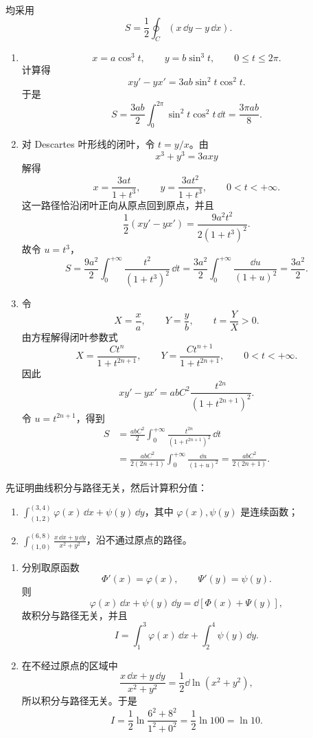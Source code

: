 \begin{xsolution}
均采用
\[
  S=\frac12\oint_C(x\,\dd y-y\,\dd x).
\]
\begin{enumerate}[label=(\arabic*)]
\item
\[
  x=a\cos^3t,\qquad y=b\sin^3t,\qquad0\le t\le2\pi.
\]
计算得
\[
  x y'-y x'=3ab\sin^2t\cos^2t.
\]
于是
\[
  S=\frac{3ab}{2}\int_0^{2\pi}\sin^2t\cos^2t\,\dd t
   =\frac{3\pi ab}{8}.
\]

\item 对 Descartes 叶形线的闭叶，令 $t=y/x$。由
\[
  x^3+y^3=3axy
\]
解得
\[
  x=\frac{3at}{1+t^3},
  \qquad
  y=\frac{3at^2}{1+t^3},
  \qquad0<t<+\infty.
\]
这一路径恰沿闭叶正向从原点回到原点，并且
\[
  \frac12(xy'-yx')=\frac{9a^2t^2}{2(1+t^3)^2}.
\]
故令 $u=t^3$，
\[
  S=\frac{9a^2}{2}\int_0^{+\infty}\frac{t^2}{(1+t^3)^2}\,\dd t
   =\frac{3a^2}{2}\int_0^{+\infty}\frac{\dd u}{(1+u)^2}
   =\frac{3a^2}{2}.
\]

\item 令
\[
  X=\frac xa,\qquad Y=\frac yb,
  \qquad t=\frac YX>0.
\]
由方程解得闭叶参数式
\[
  X=\frac{Ct^n}{1+t^{2n+1}},
  \qquad
  Y=\frac{Ct^{n+1}}{1+t^{2n+1}},
  \qquad0<t<+\infty.
\]
因此
\[
  xy'-yx'
  =abC^2\frac{t^{2n}}{(1+t^{2n+1})^2}.
\]
令 $u=t^{2n+1}$，得到
\begin{align*}
  S
  &=\frac{abC^2}{2}\int_0^{+\infty}
    \frac{t^{2n}}{(1+t^{2n+1})^2}\,\dd t\\
  &=\frac{abC^2}{2(2n+1)}
    \int_0^{+\infty}\frac{\dd u}{(1+u)^2}
   =\frac{abC^2}{2(2n+1)}.
\end{align*}
\end{enumerate}
\end{xsolution}
\begin{xexercise}[8]
先证明曲线积分与路径无关，然后计算积分值：
\begin{enumerate}[label=(\arabic*)]
  \item $\displaystyle\int_{(1,2)}^{(3,4)}\varphi(x)\,\dd x+\psi(y)\,\dd y$，其中 $\varphi(x),\psi(y)$ 是连续函数；
  \item $\displaystyle\int_{(1,0)}^{(6,8)}\frac{x\,\dd x+y\,\dd y}{x^2+y^2}$，沿不通过原点的路径。
\end{enumerate}
\end{xexercise}
\begin{xsolution}
\begin{enumerate}[label=(\arabic*)]
\item 分别取原函数
\[
  \Phi'(x)=\varphi(x),\qquad \Psi'(y)=\psi(y).
\]
则
\[
  \varphi(x)\,\dd x+\psi(y)\,\dd y
  =\dd[\Phi(x)+\Psi(y)],
\]
故积分与路径无关，并且
\[
  I=\int_1^3\varphi(x)\,\dd x+
    \int_2^4\psi(y)\,\dd y.
\]

\item 在不经过原点的区域中
\[
  \frac{x\,\dd x+y\,\dd y}{x^2+y^2}
  =\frac12\dd\ln(x^2+y^2),
\]
所以积分与路径无关。于是
\[
  I=\frac12\ln\frac{6^2+8^2}{1^2+0^2}
   =\frac12\ln100=\ln10.
\]
\end{enumerate}
\end{xsolution}
